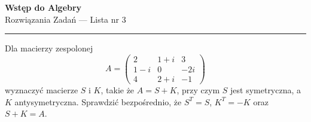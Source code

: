 \documentclass[11pt,a4paper]{article}
\newenvironment{zadanie}[1]{%
    \begin{tcolorbox}[title={Zadanie #1}, colbacktitle=TitleBg]
}{%
    \end{tcolorbox}\vspace{0.3cm}%
}
\begin{document}
\begin{center}
    {\Huge \sffamily \bfseries \color{MainColor} Wstęp do Algebry}\\[0.2cm]
    {\Large \sffamily \color{AccentColor} Rozwiązania Zadań --- Lista nr 3}\\[0.3cm]
    {\color{MainColor}\rule{\textwidth}{1.5pt}}
\end{center}

\vspace{0.3cm}

\begin{zadanie}{1}
Dla macierzy zespolonej
\[
A = \begin{pmatrix} 2 & 1+i & 3 \\ 1-i & 0 & -2i \\ 4 & 2+i & -1 \end{pmatrix}
\]
wyznaczyć macierze $S$ i $K$, takie że $A=S+K$, przy czym $S$ jest symetryczna, a $K$ antysymetryczna. Sprawdzić bezpośrednio, że $S^T = S$, $K^T = -K$ oraz $S+K = A$.
\end{zadanie}
\end{document}
